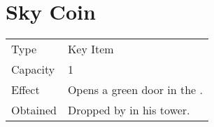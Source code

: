 \section{Sky Coin}
\label{item:sky_coin}


\noindent\begin{tabularx}{\textwidth}[l]{lX}
	Type
	& Key Item
\\
	Capacity
	& 1
\\
	Effect
	& Opens a green door in the \nameref{map:focus_tower}.
\\
	Obtained
	& Dropped by \nameref{monster:pazuzu} in his tower.
\end{tabularx}
